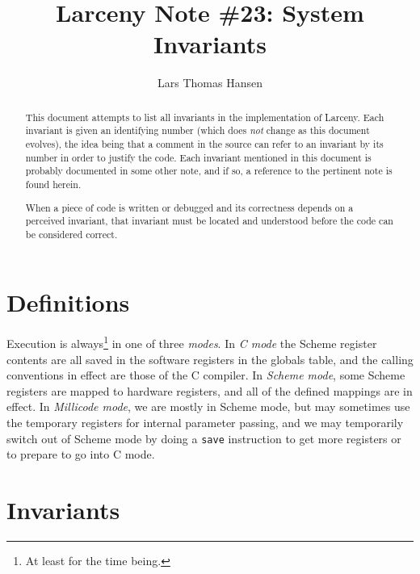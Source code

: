 
\title{Larceny Note \#23: System Invariants}
\author{Lars Thomas Hansen}


\maketitle

\begin{abstract}
This document attempts to list all invariants in the implementation of Larceny.
Each invariant is given an identifying number (which does {\em not} change
as this document evolves), the idea being that a comment in the source can
refer to an invariant by its number in order to justify the code. Each
invariant mentioned in this document is probably documented in some other
note, and if so, a reference to the pertinent note is found herein.

When a piece of code is written or debugged and its correctness depends on
a perceived invariant, that invariant must be located and understood before
the code can be considered correct.
\end{abstract}

\section{Definitions}

Execution is always\footnote{At least for the time being.} in one of three
{\em modes}. In {\em C mode} the Scheme register contents are all saved
in the software registers in the globals table, and the calling conventions
in effect are those of the C compiler. In {\em Scheme mode}, some Scheme
registers are mapped to hardware registers, and all of the defined mappings
are in effect. In {\em Millicode mode}, we are mostly in Scheme mode,
but may sometimes use the temporary registers for internal parameter passing,
and we may temporarily switch out of Scheme mode by doing a {\tt save}
instruction to get more registers or to prepare to go into C mode.


\section{Invariants}

